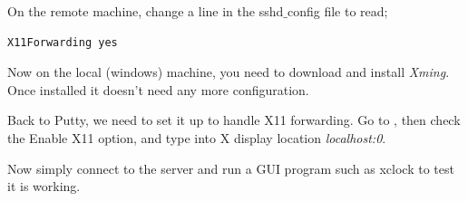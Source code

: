 On the remote machine, change a line in the sshd$\_$config file to read;

\begin{lstlisting}
X11Forwarding yes
\end{lstlisting}

Now on the local (windows) machine, you need to download and install \textit{Xming}. Once installed it doesn't need any more configuration.

Back to Putty, we need to set it up to handle X11 forwarding.  Go to , then check the Enable X11 option, and type into X display location \textit{localhost:0}.

Now simply connect to the server and run a GUI program such as xclock to test it is working.
